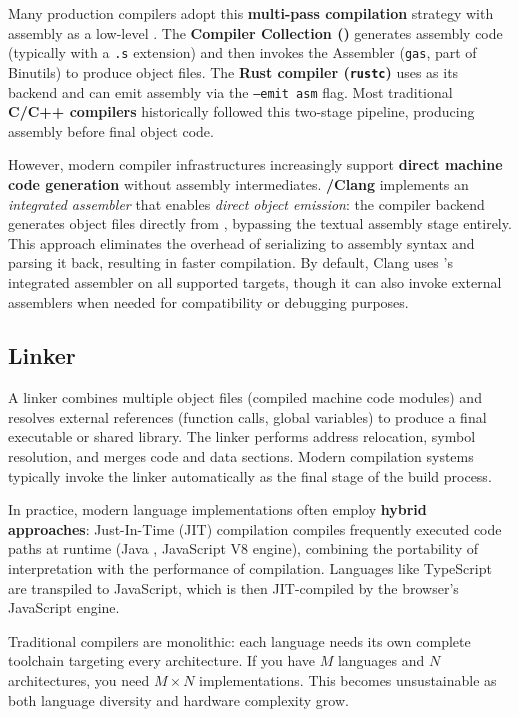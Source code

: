   Many production compilers adopt this \textbf{multi-pass compilation} strategy with assembly as a low-level . The \textbf{ Compiler Collection ()} generates assembly code (typically with a \texttt{.s} extension) and then invokes the  Assembler (\texttt{gas}, part of  Binutils) to produce object files. The \textbf{Rust compiler (\texttt{rustc})} uses  as its backend and can emit assembly via the \texttt{--emit asm} flag. Most traditional \textbf{C/C++ compilers} historically followed this two-stage pipeline, producing assembly before final object code.

  However, modern compiler infrastructures increasingly support \textbf{direct machine code generation} without assembly intermediates. \textbf{/Clang} implements an \textit{integrated assembler} that enables \textit{direct object emission}: the compiler backend generates object files directly from  , bypassing the textual assembly stage entirely. This approach eliminates the overhead of serializing to assembly syntax and parsing it back, resulting in faster compilation. By default, Clang uses 's integrated assembler on all supported targets, though it can also invoke external assemblers when needed for compatibility or debugging purposes.

\subsection{Linker}
A linker combines multiple object files (compiled machine code modules) and resolves external references (function calls, global variables) to produce a final executable or shared library. The linker performs address relocation, symbol resolution, and merges code and data sections. Modern compilation systems typically invoke the linker automatically as the final stage of the build process.

In practice, modern language implementations often employ \textbf{hybrid approaches}: Just-In-Time (JIT) compilation compiles frequently executed code paths at runtime (Java , JavaScript V8 engine), combining the portability of interpretation with the performance of compilation. Languages like TypeScript are transpiled to JavaScript, which is then JIT-compiled by the browser's JavaScript engine.

Traditional compilers are monolithic: each language needs its own complete toolchain targeting every architecture. If you have \(M\) languages and \(N\) architectures, you need \(M \times N\) implementations. This becomes unsustainable as both language diversity and hardware complexity grow.

